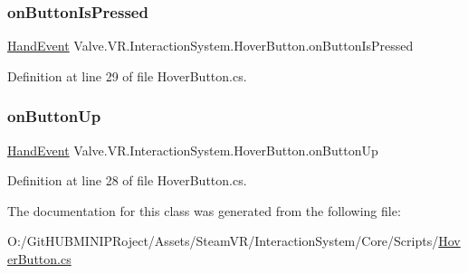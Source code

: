 \subsubsection{\texorpdfstring{onButtonIsPressed}{onButtonIsPressed}}
{\footnotesize\ttfamily \mbox{\hyperlink{class_valve_1_1_v_r_1_1_interaction_system_1_1_hand_event}{Hand\+Event}} Valve.\+V\+R.\+Interaction\+System.\+Hover\+Button.\+on\+Button\+Is\+Pressed}



Definition at line 29 of file Hover\+Button.\+cs.

\mbox{\label{class_valve_1_1_v_r_1_1_interaction_system_1_1_hover_button_ac1ed67633ae9ca279bff0f81ae8de35d}} 
\subsubsection{\texorpdfstring{onButtonUp}{onButtonUp}}
{\footnotesize\ttfamily \mbox{\hyperlink{class_valve_1_1_v_r_1_1_interaction_system_1_1_hand_event}{Hand\+Event}} Valve.\+V\+R.\+Interaction\+System.\+Hover\+Button.\+on\+Button\+Up}



Definition at line 28 of file Hover\+Button.\+cs.



The documentation for this class was generated from the following file\+:\begin{DoxyCompactItemize}
\item 
O\+:/\+Git\+H\+U\+B\+M\+I\+N\+I\+P\+Roject/\+Assets/\+Steam\+V\+R/\+Interaction\+System/\+Core/\+Scripts/\mbox{\hyperlink{_hover_button_8cs}{Hover\+Button.\+cs}}\end{DoxyCompactItemize}
